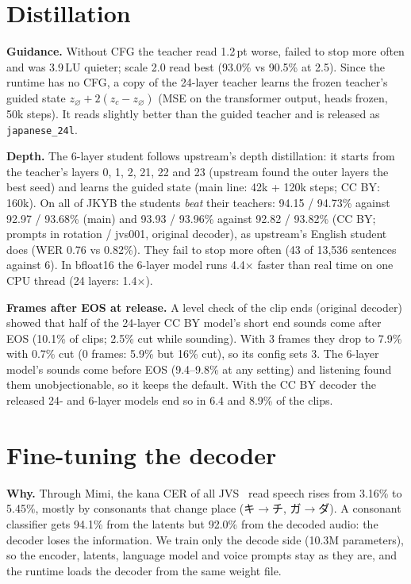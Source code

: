 \documentclass[10pt,a4paper,twocolumn]{article}
\newcommand{\pt}{\,pt}
\begin{document}
\section{Distillation}\label{sec:distill}
\textbf{Guidance.} Without CFG the teacher read 1.2\pt{} worse, failed to stop more often and was
3.9\,LU quieter; scale 2.0 read best (93.0\% vs 90.5\% at 2.5). Since the runtime has no CFG, a copy
of the 24-layer teacher learns the frozen teacher's guided state $z_\varnothing+2(z_c-z_\varnothing)$
(MSE on the transformer output, heads frozen, 50k steps). It reads slightly better than the guided
teacher and is released as \texttt{japanese\_24l}.

\textbf{Depth.} The 6-layer student follows upstream's depth distillation: it starts from the
teacher's layers 0, 1, 2, 21, 22 and 23 (upstream found the outer layers the best seed) and learns
the guided state (main line: 42k + 120k steps; CC BY: 160k). On all of JKYB the students \emph{beat}
their teachers: 94.15 / 94.73\% against 92.97 / 93.68\% (main) and 93.93 / 93.96\% against 92.82 /
93.82\% (CC BY; prompts in rotation / jvs001, original decoder), as upstream's English student does
(WER 0.76 vs 0.82\%). They fail to stop more often (43 of 13,536 sentences against 6). In bfloat16 the
6-layer model runs 4.4$\times$ faster than real time on one CPU thread (24 layers: 1.4$\times$).

\textbf{Frames after EOS at release.} A level check of the clip ends (original decoder) showed that half of the 24-layer
CC BY model's short end sounds come after EOS (10.1\% of clips; 2.5\% cut while sounding). With 3
frames they drop to 7.9\% with 0.7\% cut (0 frames: 5.9\% but 16\% cut), so its config sets 3. The
6-layer model's sounds come before EOS (9.4--9.8\% at any setting) and listening found them
unobjectionable, so it keeps the default. With the CC BY decoder the released 24- and 6-layer models
end so in 6.4 and 8.9\% of the clips.

\section{Fine-tuning the decoder}\label{sec:decoder}
\textbf{Why.} Through Mimi, the kana CER of all JVS~\cite{jvs} read speech rises from 3.16\% to
5.45\%, mostly by consonants that change place (キ$\to$チ, ガ$\to$ダ). A consonant classifier gets
94.1\% from the latents but 92.0\% from the decoded audio: the decoder loses the information. We
train only the decode side (10.3M parameters), so the encoder, latents, language model and voice
prompts stay as they are, and the runtime loads the decoder from the same weight file.
\end{document}
